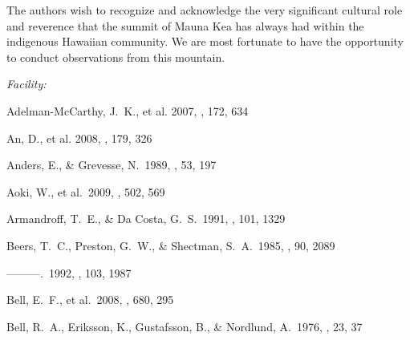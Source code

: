 \documentclass{emulateapj}
\begin{document}
The authors wish to recognize and acknowledge the very significant
cultural role and reverence that the summit of Mauna Kea has always
had within the indigenous Hawaiian community.  We are most fortunate
to have the opportunity to conduct observations from this mountain.

{\it Facility:} 


\begin{thebibliography}{}

 Adelman-McCarthy,
  J.~K., et al. 2007, \apjs, 172, 634


 An, D., et al. 2008, \apjs, 179, 326

 Anders, E., \& Grevesse,
  N.\ 1989, \gca, 53, 197

 Aoki, W., et al.\ 2009, \aap, 502,
  569

 Armandroff, T.~E., \& Da
  Costa, G.~S.\ 1991, \aj, 101, 1329




 Beers, T.~C., Preston, G.~W., \&
  Shectman, S.~A.\ 1985, \aj, 90, 2089

 ---------.\ 1992, \aj, 103, 1987


 Bell, E.~F., et al.\ 2008, \apj,
  680, 295

 Bell, R.~A., Eriksson, K.,
  Gustafsson, B., \& Nordlund, A.\ 1976, \aaps, 23, 37


\end{thebibliography}
\end{document}
